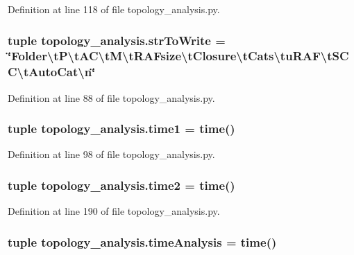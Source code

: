 Definition at line 118 of file topology\-\_\-analysis.\-py.

\hypertarget{a00157_acecbaeef1428691283d6df79d6b1e689}{
\subsubsection[{str\-To\-Write}]{\setlength{\rightskip}{0pt plus 5cm}tuple topology\-\_\-analysis.\-str\-To\-Write = \char`\"{}Folder\textbackslash{}t\-P\textbackslash{}t\-A\-C\textbackslash{}t\-M\textbackslash{}t\-R\-A\-Fsize\textbackslash{}t\-Closure\textbackslash{}t\-Cats\textbackslash{}tu\-R\-A\-F\textbackslash{}t\-S\-C\-C\textbackslash{}t\-Auto\-Cat\textbackslash{}n\char`\"{}}}\label{a00157_acecbaeef1428691283d6df79d6b1e689}


Definition at line 88 of file topology\-\_\-analysis.\-py.

\hypertarget{a00157_ac7160059dec8067db4645fa39feec359}{
\subsubsection[{time1}]{\setlength{\rightskip}{0pt plus 5cm}tuple topology\-\_\-analysis.\-time1 = time()}}\label{a00157_ac7160059dec8067db4645fa39feec359}


Definition at line 98 of file topology\-\_\-analysis.\-py.

\hypertarget{a00157_a44666efa43bfc08ab8305c8d325f7456}{
\subsubsection[{time2}]{\setlength{\rightskip}{0pt plus 5cm}tuple topology\-\_\-analysis.\-time2 = time()}}\label{a00157_a44666efa43bfc08ab8305c8d325f7456}


Definition at line 190 of file topology\-\_\-analysis.\-py.

\hypertarget{a00157_ace5bda70ff24e6a220afb4438240003a}{
\subsubsection[{time\-Analysis}]{\setlength{\rightskip}{0pt plus 5cm}tuple topology\-\_\-analysis.\-time\-Analysis = time()}}\label{a00157_ace5bda70ff24e6a220afb4438240003a}


